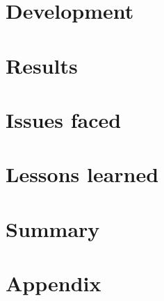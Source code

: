 \documentclass[
pdftex,                %
a4paper,                 %
11pt,                     %
parskip=half,         %
headsepline,        %
]
{scrartcl}
\begin{document}
  

  \pagebreak

  \section{Development}

  

  \pagebreak

  \section{Results}

  

  \section{Issues faced}

  

  \section{Lessons learned}

  
	
	\section{Summary}
	
	
	
	\renewcommand{\refname}{Literatur}
	\begin{thebibliography}{xxxx}
		
	\end{thebibliography}

  \pagebreak

  \appendix

  \section*{Appendix}

  
	
\end{document}
